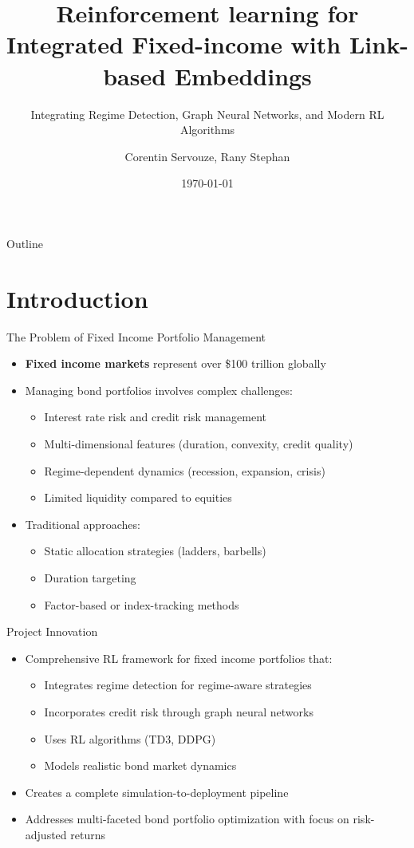 \documentclass{beamer}
\title{Reinforcement learning for Integrated Fixed-income with Link-based Embeddings}
\subtitle{Integrating Regime Detection, Graph Neural Networks, and Modern RL Algorithms}
\author{Corentin Servouze, Rany Stephan}
\date{\today}
\begin{document}
\begin{frame}
\titlepage
\end{frame}

\begin{frame}{Outline}
\tableofcontents
\end{frame}

\section{Introduction}

\begin{frame}{The Problem of Fixed Income Portfolio Management}
\begin{itemize}
    \item \textbf{Fixed income markets} represent over \$100 trillion globally
    \item Managing bond portfolios involves complex challenges:
    \begin{itemize}
        \item Interest rate risk and credit risk management
        \item Multi-dimensional features (duration, convexity, credit quality)
        \item Regime-dependent dynamics (recession, expansion, crisis)
        \item Limited liquidity compared to equities
    \end{itemize}
    \item Traditional approaches:
    \begin{itemize}
        \item Static allocation strategies (ladders, barbells)
        \item Duration targeting
        \item Factor-based or index-tracking methods
    \end{itemize}
\end{itemize}
\end{frame}

\begin{frame}{Project Innovation}
\begin{itemize}
    \item Comprehensive RL framework for fixed income portfolios that:
    \begin{itemize}
        \item Integrates regime detection for regime-aware strategies
        \item Incorporates credit risk through graph neural networks
        \item Uses RL algorithms (TD3, DDPG)
        \item Models realistic bond market dynamics
    \end{itemize}
    \item Creates a complete simulation-to-deployment pipeline
    \item Addresses multi-faceted bond portfolio optimization with focus on risk-adjusted returns
\end{itemize}
\end{frame}
\end{document}
